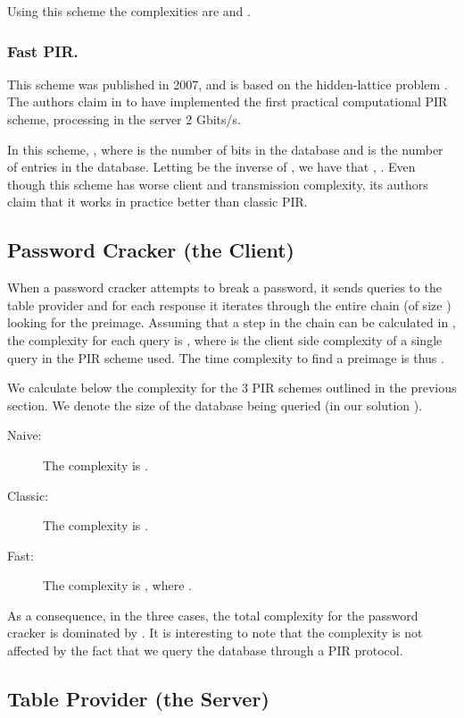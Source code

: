 \documentclass{llncs}
\begin{document}
Using this scheme the complexities are  and .


\subsubsection{Fast PIR.}

This scheme was published in 2007, and is based
on the hidden-lattice problem \cite{paper:ag-07}. 
The authors claim in \cite{paper:a-08} to have implemented the
first practical computational PIR scheme,
processing in the server 2 Gbits/s. 

In this scheme, , where  is the number of bits
in the database and  is the number of entries in the database.
Letting  be the inverse of ,
we have that , .
Even though this scheme has worse client and transmission complexity,
its authors claim that it works in practice better than classic PIR.




\subsection{Password Cracker (the Client)} 
\label{sec:password-cracker}

When a password cracker attempts to break a password, it sends 
queries to the table provider and for each response it iterates through
the entire chain (of size ) looking for the preimage. Assuming that a step in
the chain can be calculated in , the complexity for each query
is , 
where  is the client side complexity of a single query in
the PIR scheme used.
The time complexity to find a preimage is thus .

We calculate below the complexity  for the 3 PIR schemes outlined in the
previous section. We denote  the size of the database being
queried (in our solution ).
\begin{description}
\item [{Naive:}] The complexity  is .
\item [{Classic:}] The complexity  is .
\item [{Fast:}] The complexity  is , where .
\end{description}
As a consequence, in the three cases, the total complexity for the password cracker is 
dominated by .
It is interesting to note that the complexity is not affected by
the fact that we query the database through a PIR protocol.


\subsection{Table Provider (the Server)}
\end{document}
